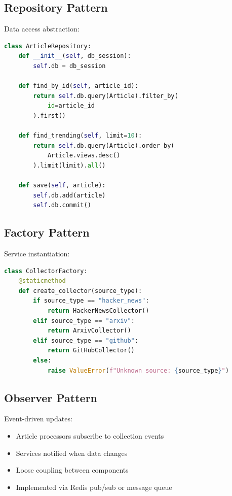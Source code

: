 \documentclass[12pt,a4paper]{report}
\begin{document}
\subsection{Repository Pattern}

Data access abstraction:

\begin{lstlisting}[language=Python, caption=Repository Pattern Example]
class ArticleRepository:
    def __init__(self, db_session):
        self.db = db_session
    
    def find_by_id(self, article_id):
        return self.db.query(Article).filter_by(
            id=article_id
        ).first()
    
    def find_trending(self, limit=10):
        return self.db.query(Article).order_by(
            Article.views.desc()
        ).limit(limit).all()
    
    def save(self, article):
        self.db.add(article)
        self.db.commit()
\end{lstlisting}

\subsection{Factory Pattern}

Service instantiation:

\begin{lstlisting}[language=Python, caption=Factory Pattern Example]
class CollectorFactory:
    @staticmethod
    def create_collector(source_type):
        if source_type == "hacker_news":
            return HackerNewsCollector()
        elif source_type == "arxiv":
            return ArxivCollector()
        elif source_type == "github":
            return GitHubCollector()
        else:
            raise ValueError(f"Unknown source: {source_type}")
\end{lstlisting}

\subsection{Observer Pattern}

Event-driven updates:

\begin{itemize}[label=\textbullet]
    \item Article processors subscribe to collection events
    \item Services notified when data changes
    \item Loose coupling between components
    \item Implemented via Redis pub/sub or message queue
\end{itemize}
\end{document}
